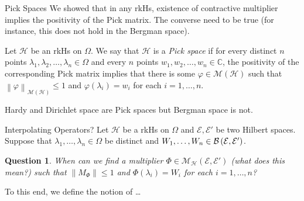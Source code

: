 \documentclass{beamer}
\newtheorem{question}[theorem]{Question}
\newcommand{\C}{\mathbb C}
\renewcommand{\le}{\leqslant}
\newcommand{\calE}{{\mathcal E}}
\newcommand{\calH}{{\mathcal H}}
\newcommand{\calM}{{\mathcal M}}
\newcommand{\norm}[1]{\left\lVert #1 \right\rVert}
\begin{document}
\begin{frame}{Pick Spaces}
We showed that in any rkHs, existence of contractive multiplier implies the positivity of the Pick matrix. The converse need to be true (for instance, this does not hold in the Bergman space).
\pause
\begin{definition}
Let $\calH$ be an rkHs on $\Omega$. We say that $\calH$ is a \textit{Pick space} if for every distinct $n$ points $\lambda_{1}, \lambda_{2}, \ldots , \lambda_{n} \in \Omega$ and every $n$ points $w_{1}, w_{2}, \ldots , w_{n} \in \C$, the positivity of the corresponding Pick matrix implies that there is some $\varphi \in \calM \left( \calH \right)$ such that $\norm{\varphi}_{\calM \left( \calH \right)} \le 1$ and $\varphi \left( \lambda_{i} \right) = w_{i}$ for each $i=1, \ldots , n$.
\label{def:Pick space}
\end{definition}
\pause
\begin{example}
Hardy and Dirichlet space are Pick spaces but Bergman space is not.
\end{example}
\end{frame}

\begin{frame}{Interpolating Operators?}
Let $\calH$ be a rkHs on $\Omega$ and $\calE , \calE'$ be two Hilbert spaces.
\pause
Suppose that $\lambda_{1}, \ldots, \lambda_{n} \in \Omega$ be distinct and $W_{1}, \ldots , W_{n} \in \cal{B} \left( \calE , \calE' \right)$. 
\pause
\begin{question}
When can we find a multiplier $\Phi \in \calM_{\calH} \left( \calE , \calE' \right)$ (\textit{what does this mean?}) such that $\norm{M_{\Phi}} \le 1$ and $\Phi \left( \lambda_{i} \right) = W_{i}$ for each $i=1, \ldots , n$?
\end{question}
\pause
To this end, we define the notion of \ldots

\end{frame}
\end{document}
